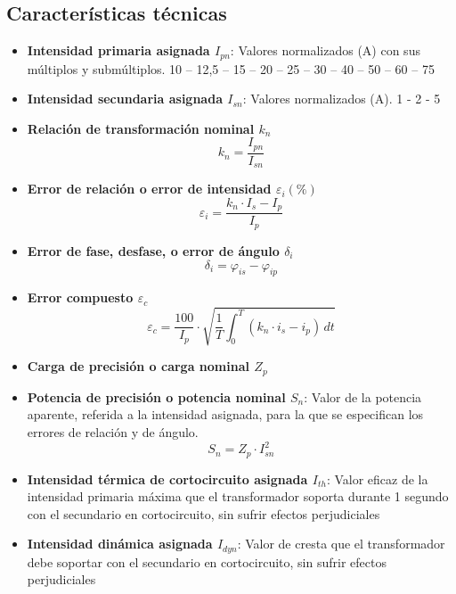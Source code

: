 \subsection{Características técnicas}
\begin{itemize}
	\item \textbf{Intensidad primaria asignada $I_{pn}$}: Valores normalizados (A) con sus múltiplos y submúltiplos. 10 – 12,5 – 15 – 20 – 25 – 30 – 40 – 50 – 60 – 75
	\item \textbf{Intensidad secundaria asignada $I_{sn}$}: Valores normalizados (A). 1 - 2 - 5
	\item \textbf{Relación de transformación nominal $k_n$}
	\begin{equation}
		k_n=\dfrac{I_{pn}}{I_{sn}}
	\end{equation}
	\item \textbf{Error de relación o error de intensidad $\varepsilon_i(\%)$}
	\begin{equation}
		\varepsilon_i=\dfrac{k_n\cdot I_s-I_p}{I_p}
	\end{equation}
	\item \textbf{Error de fase, desfase, o error de ángulo $\delta_i$}
	\begin{equation}
		\delta_i=\varphi_{is}-\varphi_{ip}
	\end{equation}
	\item \textbf{Error compuesto $\varepsilon_c$}
	\begin{equation}
		\varepsilon_c=\dfrac{100}{I_p}\cdot\sqrt{\dfrac{1}{T}\int_0^T\left(k_n\cdot i_s - i_p\right)\, dt}
	\end{equation}
	\item \textbf{Carga de precisión o carga nominal $Z_p$}
	\item \textbf{Potencia de precisión o potencia nominal $S_n$}: Valor de la potencia aparente, referida a la intensidad asignada, para la que se especifican los errores de relación y de ángulo.
	\begin{equation}
		S_n=Z_p\cdot I_{sn}^2
	\end{equation}
	\item \textbf{Intensidad térmica de cortocircuito asignada $I_{th}$}: Valor eficaz de la intensidad primaria máxima que el transformador soporta durante 1 segundo con el secundario en cortocircuito, sin sufrir efectos perjudiciales
	\item \textbf{Intensidad dinámica asignada $I_{dyn}$}: Valor de cresta que el transformador debe soportar con el secundario en cortocircuito, sin sufrir efectos perjudiciales

\end{itemize}
